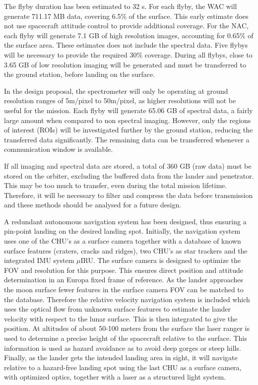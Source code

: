 The flyby duration has been estimated to 32 s. For each flyby, the WAC will generate 711.17 MB data, covering 6.5\% of the surface. This early estimate does not use spacecraft attitude control to provide additional coverage. For the NAC, each flyby will generate 7.1 GB of high resolution images, accounting for 0.65\% of the surface area. These estimates does not include the spectral data. Five flybys will be necessary to provide the required 30\% coverage. During all flybys, close to 3.65 GB of low resolution imaging will be generated and must be transferred to the ground station, before landing on the surface.

In the design proposal, the spectrometer will only be operating at ground resolution ranges of 5m/pixel to 50m/pixel, as higher resolutions will not be useful for the mission. Each flyby will generate 65.06 GB of spectral data, a fairly large amount when compared to non spectral imaging. However, only the regions of interest (ROIs) will be investigated further by the ground station, reducing the transferred data significantly. The remaining data can be transferred whenever a communication window is available. 

If all imaging and spectral data are stored, a total of 360 GB (raw data) must be stored on the orbiter,  excluding the buffered data from the lander and penetrator. This may be too much to transfer, even during the total mission lifetime. Therefore, it will be necessary to filter and compress the data before transmission and these methods should be analysed for a future design.


A redundant autonomous navigation system has been designed, thus ensuring a pin-point landing on the desired landing spot. Initially, the navigation system uses one of the CHU's as a surface camera together with a database of known surface features (craters, cracks and ridges), two CHU's as star trackers and the integrated IMU system $\mu$IRU. The surface camera is designed to optimize the FOV and resolution for this purpose. This ensures direct position and attitude determination in an Europa fixed frame of reference.
As the lander approaches the moon surface fewer features in the surface camera FOV can be matched to the database. Therefore the relative velocity navigation system is included which uses the optical flow from unknown surface features to estimate the lander velocity with respect to the lunar surface. This is then integrated to give the position. At altitudes of about 50-100 meters from the surface the laser ranger is used to determine a precise height of the spacecraft relative to the surface. This information is used as hazard avoidance as to avoid deep gorges or steep hills. Finally, as the lander gets the intended landing area in sight, it will navigate relative to a hazard-free landing spot using the last CHU as a surface camera, with optimized optics, together with a laser as a structured light system. 

